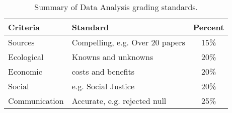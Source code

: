 \begin{table}[h]
\caption{Summary of Data Analysis grading standards.}
\label{tab:regionalimpactsgrading}
\begin{tabular}{llc}\hline
Criteria            &   Standard    & Percent \\ \hline\hline
Sources     & Compelling, e.g. Over 20 papers & 15\% \\
Ecological  & Knowns and unknowns             & 20\% \\
Economic    & costs and benefits              & 20\% \\
Social      & e.g. Social Justice             & 20\% \\
Communication    & Accurate, e.g. rejected null   & 25\% \\

\hline
\end{tabular}
\end{table}